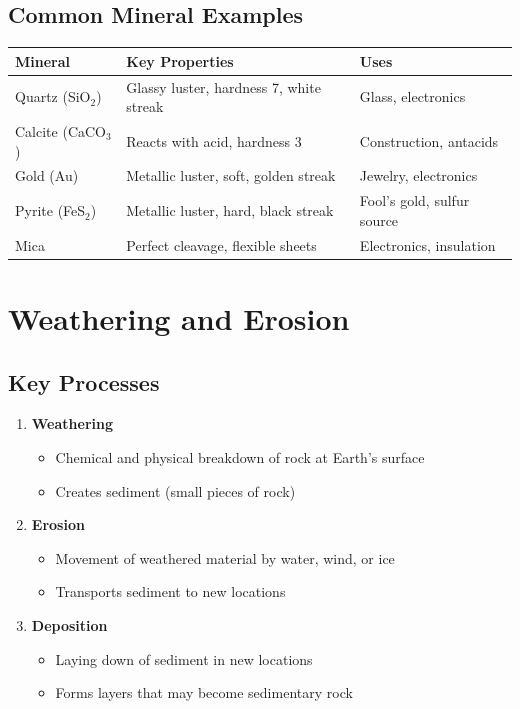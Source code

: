\documentclass{article}
\begin{document}
\subsection{Common Mineral Examples}
\begin{tabular}{@{}p{} p{} p{}@{}}
\textbf{Mineral} & \textbf{Key Properties} & \textbf{Uses} \\
\midrule
Quartz (SiO$_2$) & Glassy luster, hardness 7, white streak & Glass, electronics \\
Calcite (CaCO$_3$) & Reacts with acid, hardness 3 & Construction, antacids \\
Gold (Au) & Metallic luster, soft, golden streak & Jewelry, electronics \\
Pyrite (FeS$_2$) & Metallic luster, hard, black streak & Fool's gold, sulfur source \\
Mica & Perfect cleavage, flexible sheets & Electronics, insulation \\
\end{tabular}

\section{Weathering and Erosion}

\subsection{Key Processes}
\begin{enumerate}
    \item \textbf{Weathering}
    \begin{itemize}
        \item Chemical and physical breakdown of rock at Earth's surface
        \item Creates sediment (small pieces of rock)
    \end{itemize}
    
    \item \textbf{Erosion}
    \begin{itemize}
        \item Movement of weathered material by water, wind, or ice
        \item Transports sediment to new locations
    \end{itemize}
    
    \item \textbf{Deposition}
    \begin{itemize}
        \item Laying down of sediment in new locations
        \item Forms layers that may become sedimentary rock
    \end{itemize}
\end{enumerate}
\end{document}
